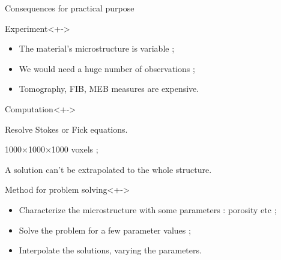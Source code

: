 \begin{frame}{Consequences for practical purpose}
%
\begin{block}{Experiment}<+->
\begin{itemize}
\item<+-> The material's microstructure is variable ;
\item<+-> We would need a huge number of observations ;
\item<+-> Tomography, FIB, MEB measures are expensive.
\end{itemize}
\end{block}
%
\begin{block}{Computation}<+->
\begin{description}
\item<+-> [Objectives] Resolve Stokes or Fick equations.
\item<+-> [High spatial resolution] 1000$\times$1000$\times$1000 voxels ;
\item<+-> [Small sample] A solution can't be extrapolated to the whole structure.
\end{description}
\end{block}
%
\begin{block}{Method for problem solving}<+->
\begin{itemize}
\item<+-> Characterize the microstructure with some parameters : porosity etc ;
\item<+-> Solve the problem for a few parameter values ;
\item<+-> Interpolate the solutions, varying the parameters.
\end{itemize}
\end{block}
%
\end{frame}